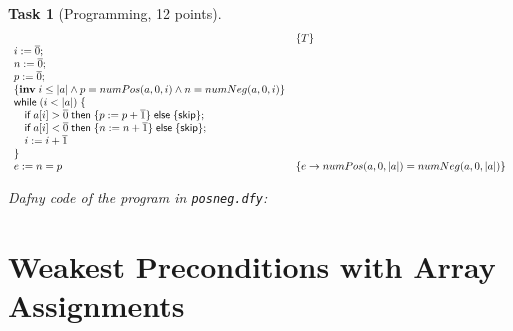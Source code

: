 \documentclass{article}
\newcommand{\stmt}[1]{\text{\sffamily #1}}
\newcommand{\ifs}[3]{\stmt{if}\;#1\;\stmt{then}\;\{#2\}\;\stmt{else}\;\{#3\}}
\newcommand{\whiles}[1]{\stmt{while}\;(#1)\;\{}
\newcommand{\assigns}[2]{#1 := #2}
\newcommand{\consts}[1]{\overline{#1}}
\newcommand{\inv}[1]{\{\textbf{inv}\;\ensuremath{#1}\}}
\newcommand{\skips}{\stmt{skip}}
\theoremstyle{task}
\newtheorem{task}{Task}[section]
\begin{document}
\begin{task}[Programming, 12 points]
    \[
        \begin{array}{l l}
            & \{T\} \\
            \assigns{i}{\consts{0}}; & \\
            \assigns{n}{\consts{0}}; & \\
            \assigns{p}{\consts{0}}; & \\
            \inv{i \leq |a| \wedge p = numPos(a, 0, i) \wedge n = numNeg(a, 0, i)} & \\
            \whiles{i < |a|} & \\
            \quad \ifs{a[i] > \consts{0}}{\assigns{p}{p + \consts{1}}}{\skips}; & \\
            \quad \ifs{a[i] < \consts{0}}{\assigns{n}{n + \consts{1}}}{\skips}; & \\
            \quad \assigns{i}{i + \consts{1}} \\
            \} & \\
            \assigns{e}{n = p} & \{e \rightarrow numPos(a, 0, |a|) = numNeg(a, 0, |a|)\}
        \end{array}
    \]

    \vspace{1em}
    Dafny code of the program in \texttt{posneg.dfy}:
    
\end{task}

\section{Weakest Preconditions with Array Assignments}
\end{document}
